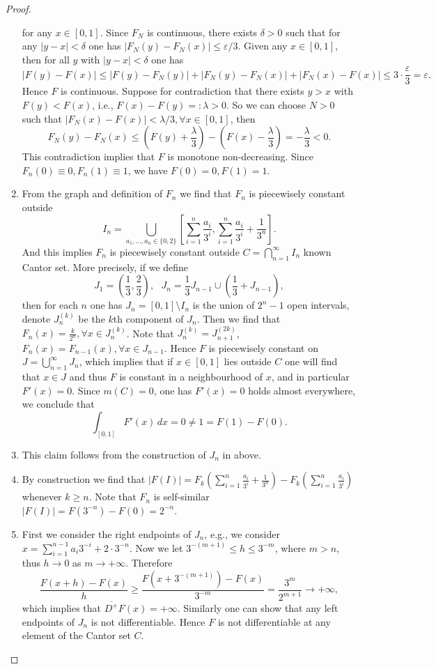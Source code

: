 \documentclass[a4paper]{article}
\begin{document}
\begin{proof}
\begin{enumerate}[label = (\roman*)]
    for any $x \in [0,1]$. Since $F_N$ is continuous, there exists $\delta > 0$ such that for any $|y - x| < \delta$
    one has $|F_N(y) - F_N(x)| \leq \varepsilon/3$. Given any $x \in [0,1]$, then for all $y$ with $|y - x| <\delta$
    one has $$
    |F(y) - F(x)| \leq |F(y) - F_N(y)| + |F_N(y) - F_N(x)| + |F_N(x) - F(x)| \leq 3\cdot\frac{\varepsilon}{3} = \varepsilon.
    $$Hence $F$ is continuous. Suppose for contradiction that there exists $y > x$ with $F(y) < F(x)$, i.e., 
    $F(x) - F(y) =: \lambda > 0$. So we can choose $N > 0$ such that $|F_N(x) - F(x)| < \lambda/3, \forall x \in [0,1]$,
    then$$
    F_N(y) - F_N(x) \leq (F(y) + \frac{\lambda}{3}) - (F(x) - \frac{\lambda}{3}) = -\frac{\lambda}{3} < 0.
    $$This contradiction implies that $F$ is monotone non-decreasing. Since $F_n(0) \equiv 0, F_n(1) \equiv 1$, we 
    have $F(0) = 0, F(1) = 1$.
    \item From the graph and definition of $F_n$ we find that $F_n$ is piecewisely constant outside $$
    I_n = \bigcup_{a_1,\dots, a_n \in \{0, 2\}}[\sum_{i = 1}^n \frac{a_i}{3^i}, \sum_{i = 1}^n \frac{a_i}{3^i} + \frac{1}{3^n}].
    $$And this implies $F_n$ is piecewisely constant outside $C = \bigcap_{n = 1}^\infty I_n$ known Cantor set. More
    precisely, if we define $$
    J_1 = (\frac{1}{3}, \frac{2}{3}),\ \ \ J_n = \frac{1}{3}J_{n - 1} \cup (\frac{1}{3} + J_{n - 1}),
    $$then for each $n$ one has $J_n = [0,1]\setminus I_n$ is the union of $2^n - 1$ open intervals, denote $J_n^{(k)}$ be the $k$th 
    component of $J_n$. Then we find that $F_n(x) = \frac{k}{2^n}, \forall x \in J_n^{(k)}$. Note that $J_n^{(k)} = J_{n + 1}^{(2k)}$,
    $F_n(x) = F_{n - 1}(x), \forall x \in J_{n - 1}$. Hence $F$ is piecewisely constant on $J = \bigcup_{n = 1}^\infty J_n$,
    which implies that if $x \in [0,1]$ lies outside $C$ one will find that $x \in J$ and thus $F$ is constant 
    in a neighbourhood of $x$, and in particular $F'(x) = 0$. Since $m(C) = 0$, one has $F'(x) = 0$ holds almost 
    everywhere, we conclude that $$
    \int_{[0,1]} F'(x)\,dx = 0\ne 1 = F(1) - F(0).
    $$
    \item This claim follows from the construction of $J_n$ in above.
    \item By construction we find that $|F(I)| = F_k(\sum_{i = 1}^n \frac{a_i}{3^i} + \frac{1}{3^n}) - F_k(\sum_{i = 1}^n \frac{a_i}{3^i})$
    whenever $k \geq n$. Note that $F_n$ is self-similar $|F(I)| = F(3^{-n}) - F(0) = 2^{-n}$.
    \item First we consider the right endpoints of $J_n$, e.g., we consider 
    $x = \sum_{i = 1}^{n - 1} a_i3^{-i} + 2\cdot 3^{-n}$. Now we let $3^{-(m + 1)} \leq h \leq  3^{-m}$, where $m > n$,
    thus $h \to 0$ as $m \to +\infty$. Therefore $$
    \frac{F(x + h) - F(x)}{h} \geq \frac{F(x + 3^{-(m + 1)}) - F(x)}{3^{-m}} = \frac{3^m}{2^{m + 1}} \to +\infty,
    $$which implies that $\overline{D^+}F(x) = +\infty$. Similarly one can show that any left endpoints of $J_n$ 
    is not differentiable. Hence $F$ is not differentiable at any element of the Cantor set $C$. \qedhere
\end{enumerate}
\end{proof}
\end{document}

